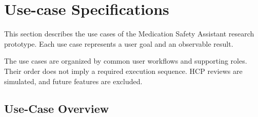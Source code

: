 
\section{Use-case Specifications}

This section describes the use cases of the
Medication Safety Assistant research prototype.
Each use case represents a user goal and an
observable result.

The use cases are organized by common user
workflows and supporting roles. Their order
does not imply a required execution sequence.
HCP reviews are simulated, and future
features are excluded.



\subsection*{Use-Case Overview}

